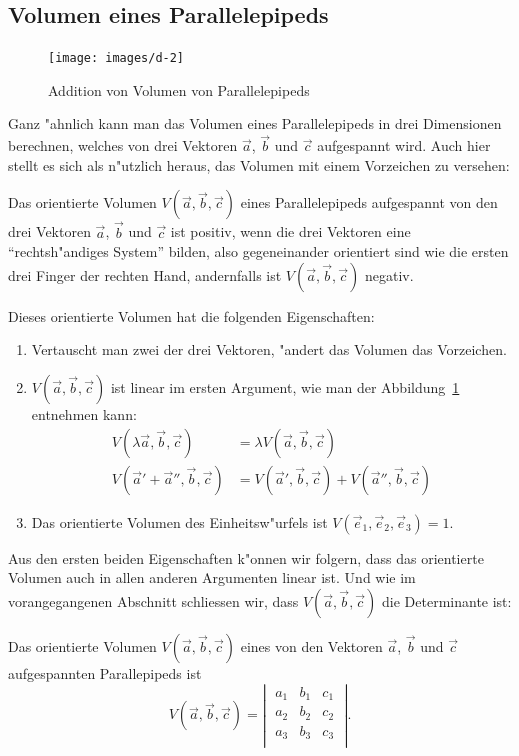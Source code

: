 \subsection{Volumen eines Parallelepipeds}
\begin{figure}
\begin{center}
\texttt{[image: images/d-2]}
\end{center}
\caption{Addition von Volumen von Parallelepipeds\label{image-volumina}}
\end{figure}
Ganz "ahnlich kann man das Volumen eines Parallelepipeds in drei Dimensionen
berechnen, welches von drei Vektoren $\vec a$, $\vec b$ und $\vec c$
aufgespannt wird.
Auch hier stellt es sich als n"utzlich heraus,
das Volumen mit einem Vorzeichen zu versehen:
\begin{definition}
Das orientierte Volumen
$V(\vec a,\vec b,\vec c)$
eines Parallelepipeds aufgespannt von den drei
Vektoren
$\vec a$, $\vec b$ und $\vec c$ ist positiv, wenn die drei Vektoren
eine ``rechtsh"andiges System'' bilden, also gegeneinander orientiert
sind wie die ersten drei Finger der rechten Hand, andernfalls ist
$V(\vec a,\vec b,\vec c)$ negativ.
\end{definition}
Dieses orientierte Volumen hat die folgenden Eigenschaften:
\begin{enumerate}
\item Vertauscht man zwei der drei Vektoren, "andert das Volumen das Vorzeichen.
\item $V(\vec a,\vec b,\vec c)$ ist linear im ersten Argument, wie man
der Abbildung~\ref{image-volumina} entnehmen kann:
\begin{align*}
V(\lambda\vec a,\vec b,\vec c)
&=
\lambda V(\vec a,\vec b,\vec c)
\\
V(\vec a'+\vec a'',\vec b,\vec c)
&=
V(\vec a',\vec b,\vec c)
+
V(\vec a'',\vec b,\vec c)
\end{align*}
\item Das orientierte Volumen des Einheitsw"urfels ist
$V(\vec e_1,\vec e_2,\vec e_3)=1$.
\end{enumerate}
Aus den ersten beiden Eigenschaften k"onnen wir folgern, dass das orientierte
Volumen auch in allen anderen Argumenten linear ist.
Und wie im vorangegangenen Abschnitt schliessen wir,
dass $V(\vec a,\vec b,\vec c)$ die Determinante ist:
\begin{satz}
Das orientierte Volumen $V(\vec a,\vec b,\vec c)$ eines von den Vektoren
$\vec a$, $\vec b$ und $\vec c$ aufgespannten Parallepipeds  ist
\[
V(\vec a,\vec b,\vec c)=\left|\;\begin{matrix}
a_1&b_1&c_1\\
a_2&b_2&c_2\\
a_3&b_3&c_3\\
\end{matrix}\;\right|.
\]
\end{satz}

